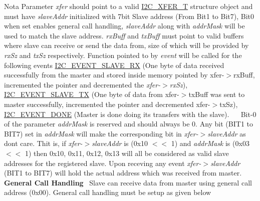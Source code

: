 \begin{DoxyNote}{Nota}
Parameter {\itshape xfer} should point to a valid \hyperlink{struct_i2_c___x_f_e_r___t}{I2\+C\+\_\+\+X\+F\+E\+R\+\_\+T} structure object and must have {\itshape slave\+Addr} initialized with 7bit Slave address (From Bit1 to Bit7), Bit0 when set enables general call handling, {\itshape slave\+Addr} along with {\itshape addr\+Mask} will be used to match the slave address. {\itshape rx\+Buff} and {\itshape tx\+Buff} must point to valid buffers where slave can receive or send the data from, size of which will be provided by {\itshape rx\+Sz} and {\itshape tx\+Sz} respectively. Function pointed to by {\itshape event} will be called for the following events \hyperlink{i2c__18xx__43xx_8h_gacb2cd4e03ea48339d327e4f387441bf3a290fcc1bb657102af26daa1b84472848}{I2\+C\+\_\+\+E\+V\+E\+N\+T\+\_\+\+S\+L\+A\+V\+E\+\_\+\+RX} (One byte of data received successfully from the master and stored inside memory pointed by xfer-\/$>$rx\+Buff, incremented the pointer and decremented the {\itshape xfer-\/$>$rx\+Sz}), \hyperlink{i2c__18xx__43xx_8h_gacb2cd4e03ea48339d327e4f387441bf3a3911d9b6505f77f0bed3f21b2710ca58}{I2\+C\+\_\+\+E\+V\+E\+N\+T\+\_\+\+S\+L\+A\+V\+E\+\_\+\+TX} (One byte of data from xfer-\/$>$tx\+Buff was sent to master successfully, incremented the pointer and decremented xfer-\/$>$tx\+Sz), \hyperlink{i2c__18xx__43xx_8h_gacb2cd4e03ea48339d327e4f387441bf3a43d00f7d92100d4af6df5514e4ccf1d1}{I2\+C\+\_\+\+E\+V\+E\+N\+T\+\_\+\+D\+O\+NE} (Master is done doing its transfers with the slave).~\newline
 ~\newline
Bit-\/0 of the parameter {\itshape addr\+Mask} is reserved and should always be 0. Any bit (B\+I\+T1 to B\+I\+T7) set in {\itshape addr\+Mask} will make the corresponding bit in {\itshape xfer-\/$>$slave\+Addr} as don\textquotesingle{}t care. Thit is, if {\itshape xfer-\/$>$slave\+Addr} is (0x10 $<$$<$ 1) and {\itshape addr\+Mask} is (0x03 $<$$<$ 1) then 0x10, 0x11, 0x12, 0x13 will all be considered as valid slave addresses for the registered slave. Upon receving any event {\itshape xfer-\/$>$slave\+Addr} (B\+I\+T1 to B\+I\+T7) will hold the actual address which was received from master.~\newline
 ~\newline
{\bfseries General Call Handling}~\newline
 Slave can receive data from master using general call address (0x00). General call handling must be setup as given below
\begin{DoxyItemize}

\end{DoxyItemize}
\end{DoxyNote}

